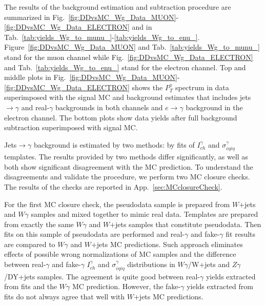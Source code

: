 The results of the background estimation and subtraction procedure are summarized in Fig.~\ref{fig:DDvsMC_Wg_Data_MUON}-\ref{fig:DDvsMC_Wg_Data_ELECTRON} and in Tab.~\ref{tab:yields_Wg_to_munu_}-\ref{tab:yields_Wg_to_enu_}. Figure~\ref{fig:DDvsMC_Wg_Data_MUON} and Tab.~\ref{tab:yields_Wg_to_munu_} stand for the muon channel while Fig.~\ref{fig:DDvsMC_Wg_Data_ELECTRON} and Tab.~\ref{tab:yields_Wg_to_enu_} stand for the electron channel. Top and middle plots in Fig.~\ref{fig:DDvsMC_Wg_Data_MUON}-\ref{fig:DDvsMC_Wg_Data_ELECTRON} shows the $P_T^\gamma$ spectrum in data superimposed with the signal MC and background estimates that includes jets$\rightarrow\gamma$ and real-$\gamma$ backgrounds in both channels and $e\rightarrow\gamma$ background in the electron channel. The bottom plots show data yields after full background subtraction superimposed with signal MC. 

Jets$\rightarrow\gamma$ background is estimated by two methods: by fits of $I_{ch}^{\gamma}$ and $\sigma_{i\eta i\eta}^{\gamma}$ templates. The results provided by two methods differ significantly, as well as both show significant disagreement with the MC prediction. To understand the disagreements and validate the procedure, we perform two MC closure checks. The results of the checks are reported in App.~\ref{sec:MCclosureCheck}.  

For the first MC closure check, the pseudodata sample is prepared from $W$+jets and $W\gamma$ samples and mixed together to mimic real data. Templates are prepared from exactly the same $W\gamma$ and $W$+jets samples that constitute pseudodata. Then fits on this sample of pseudodata are performed and real-$\gamma$ and fake-$\gamma$ fit results are compared to $W\gamma$ and $W$+jets MC predictions. Such approach eliminates effects of possible wrong normalizations of MC samples and the difference between real-$\gamma$ and fake-$\gamma$ $I_{ch}^{\gamma}$ and $\sigma_{i\eta i\eta}^{\gamma}$ distributions in $W\gamma$/W+jets and $Z\gamma$/DY+jets samples. The agreement is quite good between real-$\gamma$ yields extracted from fits and the $W\gamma$ MC prediction. However, the fake-$\gamma$ yields extracted from fits do not always agree that well with $W$+jets MC predictions.

